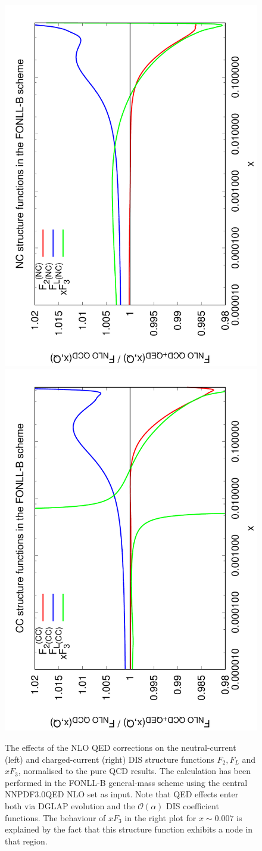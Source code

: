 \begin{figure}[!ht]
\centering
\includegraphics[width=0.7\columnwidth,angle=270]{figs/NLOQEDCorrections_NC.pdf}
\includegraphics[width=0.7\columnwidth,angle=270]{figs/NLOQEDCorrections_CC.pdf}
\caption{The effects of the NLO QED corrections on the neutral-current
(left) and charged-current (right) DIS structure functions
$F_2, F_L$ and $xF_3$, normalised to the pure QCD results.
%
The calculation has been performed in the FONLL-B general-mass scheme using the
central NNPDF3.0QED NLO
set as input.
%
Note that QED effects enter both via DGLAP evolution and the
$\mathcal{O}(\alpha)$ DIS coefficient functions.
%
The behaviour of $xF_3$ in the right plot for $x\sim 0.007$ is explained
by the fact that this structure function exhibits a node in that region.
}
\label{fig:StructFuncs}
\end{figure}
